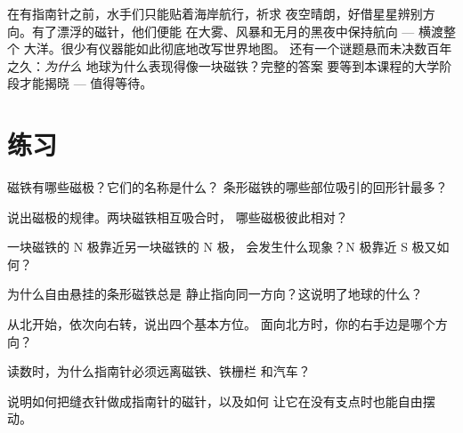 \begin{remark}[开辟大洋的仪器]\label{rem:g4:magnets-and-compass:history}
在有指南针之前，水手们只能贴着海岸航行，祈求
夜空晴朗，好借星星辨别方向。有了漂浮的磁针，他们便能
在大雾、风暴和无月的黑夜中保持航向 --- 横渡整个
大洋。很少有仪器能如此彻底地改写世界地图。
还有一个谜题悬而未决数百年之久：\emph{为什么}
地球为什么表现得像一块磁铁？完整的答案
要等到本课程的大学阶段才能揭晓 --- 值得等待。
\end{remark}

\section{练习}

\begin{exercise}[$\star$]\label{exo:g4:magnets-and-compass:1}
磁铁有哪些磁极？它们的名称是什么？
条形磁铁的哪些部位吸引的回形针最多？
\end{exercise}

\begin{exercise}[$\star$]\label{exo:g4:magnets-and-compass:2}
说出磁极的规律。两块磁铁相互吸合时，
哪些磁极彼此相对？
\end{exercise}

\begin{exercise}[$\star$]\label{exo:g4:magnets-and-compass:3}
一块磁铁的 N 极靠近另一块磁铁的 N 极，
会发生什么现象？N 极靠近 S 极又如何？
\end{exercise}

\begin{exercise}[$\star$]\label{exo:g4:magnets-and-compass:4}
为什么自由悬挂的条形磁铁总是
静止指向同一方向？这说明了地球的什么？
\end{exercise}

\begin{exercise}[$\star$]\label{exo:g4:magnets-and-compass:5}
从北开始，依次向右转，说出四个基本方位。
面向北方时，你的右手边是哪个方向？
\end{exercise}

\begin{exercise}[$\star$]\label{exo:g4:magnets-and-compass:6}
读数时，为什么指南针必须远离磁铁、铁栅栏
和汽车？
\end{exercise}

\begin{exercise}[$\star$]\label{exo:g4:magnets-and-compass:7}
说明如何把缝衣针做成指南针的磁针，以及如何
让它在没有支点时也能自由摆动。
\end{exercise}

